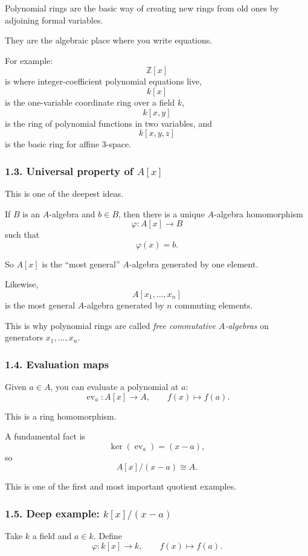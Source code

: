 \documentclass[12pt,a4paper]{article}
\theoremstyle{plain}
\theoremstyle{definition}      %
\begin{document}
	Polynomial rings are the basic way of creating new rings from old ones by adjoining formal variables.
	
	They are the algebraic place where you write equations.
	
	For example:
	\[
	\mathbb Z[x]
	\]
	is where integer-coefficient polynomial equations live,
	\[
	k[x]
	\]
	is the one-variable coordinate ring over a field \(k\),
	\[
	k[x,y]
	\]
	is the ring of polynomial functions in two variables,
	and
	\[
	k[x,y,z]
	\]
	is the basic ring for affine \(3\)-space.
	
	\subsubsection*{1.3. Universal property of \(A[x]\)}
	
	This is one of the deepest ideas.
	
	If \(B\) is an \(A\)-algebra and \(b\in B\), then there is a unique \(A\)-algebra homomorphism
	\[
	\varphi:A[x]\to B
	\]
	such that
	\[
	\varphi(x)=b.
	\]
	
	So \(A[x]\) is the ``most general'' \(A\)-algebra generated by one element.
	
	Likewise,
	\[
	A[x_1,\dots,x_n]
	\]
	is the most general \(A\)-algebra generated by \(n\) commuting elements.
	
	This is why polynomial rings are called \emph{free commutative \(A\)-algebras} on generators \(x_1,\dots,x_n\).
	
	\subsubsection*{1.4. Evaluation maps}
	
	Given \(a\in A\), you can evaluate a polynomial at \(a\):
	\[
	\operatorname{ev}_a:A[x]\to A,\qquad f(x)\mapsto f(a).
	\]
	
	This is a ring homomorphism.
	
	A fundamental fact is
	\[
	\ker(\operatorname{ev}_a)=(x-a),
	\]
	so
	\[
	A[x]/(x-a)\cong A.
	\]
	
	This is one of the first and most important quotient examples.
	
	\subsubsection*{1.5. Deep example: \(k[x]/(x-a)\)}
	
	Take \(k\) a field and \(a\in k\). Define
	\[
	\varphi:k[x]\to k,\qquad f(x)\mapsto f(a).
	\]
	
\end{document}
